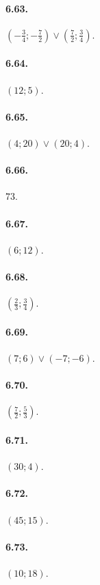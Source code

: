 \begin{multicols}{2}

\paragraph{6.63.} $\left(-\frac 3 4;-\frac 7 2\right)\vee \left(\frac 7 2;\frac 3 4\right)$.

\paragraph{6.64.} $(12;5)$.

\paragraph{6.65.} $(4;20)\vee (20;4)$.

\paragraph{6.66.} $73$.

\paragraph{6.67.} $(6;12)$.

\paragraph{6.68.} $\left(\frac{2}{3};\frac{3}{4}\right)$.

\paragraph{6.69.} $(7;6)\vee (-7;-6)$.

\paragraph{6.70.} $\left(\frac{7}{2};\frac{5}{3}\right)$.

\paragraph{6.71.} $(30;4)$.

\paragraph{6.72.} $(45;15)$.

\paragraph{6.73.} $(10;18)$.


\end{multicols}

